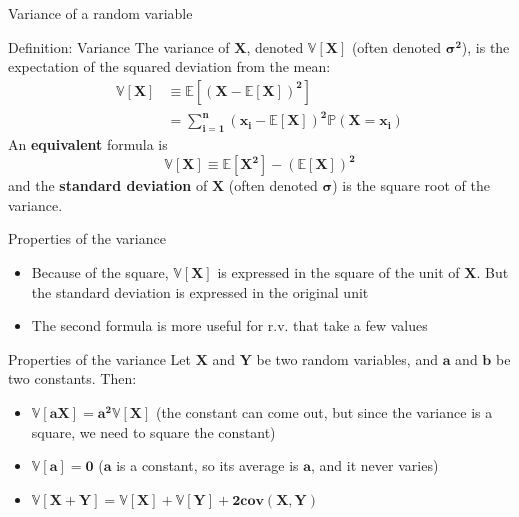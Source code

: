 \documentclass[
  ignorenonframetext,
  aspectratio=169]{beamer}
\providecommand{\tightlist}{%
  \setlength{\itemsep}{0pt}\setlength{\parskip}{0pt}}
\begin{document}
\begin{frame}{Variance of a random variable}
\protect\hypertarget{variance-of-a-random-variable}{}
\begin{block}{Definition: Variance}
The variance of $\bm{X}$, denoted $\bm{\mathbb{V}[X]}$ (often denoted $\bm{\sigma^2}$), is the expectation of the squared deviation from the mean: 
\begin{align*}
\bm{\mathbb{V}[X]} & \bm{\equiv \mathbb{E}[(X - \mathbb{E}[X])^2]}\\
                   & \bm{= \sum_{i = 1}^{n}(x_i-\mathbb{E}[X])^2\mathbb{P}(X = x_i)}
\end{align*}
An \textbf{equivalent} formula is $$\bm{\mathbb{V}[X] \equiv \mathbb{E}[X^2] - (\mathbb{E}[X])^2}$$
and the \textbf{standard deviation} of $\bm{X}$ (often denoted $\bm{\sigma}$) is the square root of the variance.
\end{block}
\end{frame}

\begin{frame}{Properties of the variance}
\protect\hypertarget{properties-of-the-variance}{}
\begin{itemize}
\tightlist
\item
  Because of the square, \(\bm{\mathbb{V}[X]}\) is expressed in the
  square of the unit of \(\bm{X}\). But the standard deviation is
  expressed in the original unit
\item
  The second formula is more useful for r.v. that take a few values
\end{itemize}

\begin{block}{Properties of the variance}
Let $\bm{X}$ and $\bm{Y}$ be two random variables, and $\bm{a}$ and $\bm{b}$ be two constants. Then:
\begin{itemize}
\item $\bm{\mathbb{V}[aX] = a^2\mathbb{V}[X]}$ (the constant can come out, but since the variance is a square, we need to square the constant)
\item $\bm{\mathbb{V}[a] = 0}$ ($\bm{a}$ is a constant, so its average is $\bm{a}$, and it never varies)
\item $\bm{\mathbb{V}[X+Y] = \mathbb{V}[X] + \mathbb{V}[Y] + 2cov(X,Y)}$ 
\end{itemize}
\end{block}
\end{frame}
\end{document}
